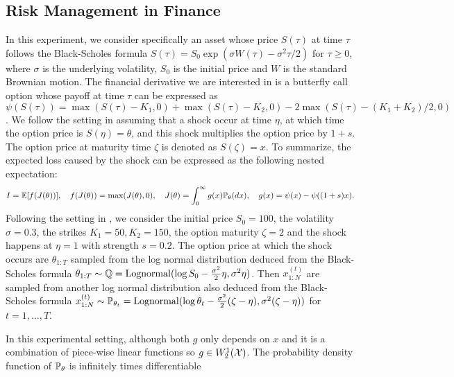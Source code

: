 \subsection{Risk Management in Finance}\label{sec:finance}
In this experiment, we consider specifically an asset whose price $S({\tau})$ at time $\tau$ follows the Black-Scholes formula $S(\tau) = S_0 \exp \left(\sigma W(\tau) - \sigma^2 \tau/2 \right)$ for $\tau \geq 0$, where $\sigma$ is the underlying volatility, $S_0$ is the initial price and $W$ is the standard Brownian motion.
The financial derivative we are interested in is a butterfly call option whose payoff at time $\tau$ can be expressed as $\psi(S({\tau}))=\max (S(\tau)-K_1, 0) + \max (S(\tau)-K_2, 0) - 2\max (S(\tau) - (K_1+K_2)/2, 0)$.
We follow the setting in \cite{alfonsi2021multilevel, alfonsi2022many, chen2024conditional} assuming that a shock occur at time $\eta$, at which time the option price is $S(\eta)=\theta$, and this shock multiplies the option price by $1 + s$. The option price at maturity time $\zeta$ is denoted as $S(\zeta) = x$. To summarize, the expected loss caused by the shock can be expressed as the following nested expectation:
\begin{align*}
    I = \operatorname{\mathbb{E}} [f(J(\theta))], \quad f(J(\theta)) = \max(J(\theta), 0), \quad J(\theta) = \int_0^\infty g(x) \mathbb{P}_\theta(dx), \quad g(x) = \psi(x)-\psi((1+s)x).
\end{align*}
Following the setting in \cite{alfonsi2021multilevel, alfonsi2022many, chen2024conditional}, we consider the initial price $S_0 = 100$, the volatility $\sigma = 0.3$, the strikes $K_1 = 50, K_2 = 150$, the option maturity $\zeta=2$ and the shock happens at $\eta=1$ with strength $s = 0.2$. 
The option price at which the shock occurs are $\theta_{1:T}$ sampled from the log normal distribution deduced from the Black-Scholes formula $\theta_{1:T} \sim \mathbb{Q} = \operatorname{Lognormal}( \log S_0 - \frac{\sigma^2}{2} \eta, \sigma^2 \eta)$. 
Then $x^{(t)}_{1:N}$ are sampled from another log normal distribution also deduced from the Black-Scholes formula $x^{(t)}_{1:N} \sim \mathbb{P}_{\theta_t} = \operatorname{Lognormal}( \log \theta_t - \frac{\sigma^2}{2} (\zeta - \eta), \sigma^2 (\zeta - \eta))$ for $t = 1, \ldots, T$.

In this experimental setting, although both  $g$ only depends on $x$ and it is a combination of piece-wise linear functions so $g \in W_2^{1}(\mathcal{X})$. The probability density function of $\mathbb{P}_{\theta}$ is infinitely times differentiable 

